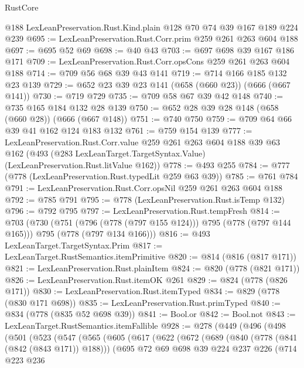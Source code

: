 \begin{lexlean}{RustCore}
\begin{coremodule}
    @188
    LexLeanPreservation.Rust.Kind.plain
    @128
    @70
    @74
    @39
    @167
    @189
    @224
    @239
@695 := LexLeanPreservation.Rust.Corr.prim @259 @261 @263 @604 @188
@697 := @695 @52 @69
@698 := @40 @43
@703 := @697 @698 @39 @167 @186 @171
@709 := LexLeanPreservation.Rust.Corr.opsCons @259 @261 @263 @604 @188
@714 := @709 @56 @68 @39 @43 @141
@719 := @714 @166 @185 @132 @23 @139
@729 := @652 @23 @39 @23 @141 (@658 (@660 @23)) (@666 (@667 @141))
@730 := @719 @729
@735 := @709 @58 @67 @39 @42 @148
@740 := @735 @165 @184 @132 @28 @139
@750 := @652 @28 @39 @28 @148 (@658 (@660 @28)) (@666 (@667 @148))
@751 := @740 @750
@759 := @709 @64 @66 @39 @41 @162 @124 @183 @132
@761 := @759 @154 @139
@777 := LexLeanPreservation.Rust.Corr.value
    @259
    @261
    @263
    @604
    @188
    @39
    @63
    @162
    (@493 (@283 LexLeanTarget.TargetSyntax.Value) (LexLeanPreservation.Rust.litValue @162))
@778 := @493 @255
@784 := @777 (@778 (LexLeanPreservation.Rust.typedLit @259 @63 @39))
@785 := @761 @784
@791 := LexLeanPreservation.Rust.Corr.opsNil @259 @261 @263 @604 @188
@792 := @785 @791
@795 := @778 (LexLeanPreservation.Rust.isTemp @132)
@796 := @792 @795
@797 := LexLeanPreservation.Rust.tempFresh
@814 := @703
    (@730
      (@751 (@796 (@778 (@797 @155 @124))) @795 (@778 (@797 @144 @165)))
      @795
      (@778 (@797 @134 @166)))
@816 := @493 LexLeanTarget.TargetSyntax.Prim
@817 := LexLeanTarget.RustSemantics.itemPrimitive
@820 := @814 (@816 (@817 @171))
@821 := LexLeanPreservation.Rust.plainItem
@824 := @820 (@778 (@821 @171))
@826 := LexLeanPreservation.Rust.itemOK @261
@829 := @824 (@778 (@826 @171))
@830 := LexLeanPreservation.Rust.itemTyped
@834 := @829 (@778 (@830 @171 @698))
@835 := LexLeanPreservation.Rust.primTyped
@840 := @834 (@778 (@835 @52 @698 @39))
@841 := Bool.or
@842 := Bool.not
@843 := LexLeanTarget.RustSemantics.itemFallible
@928 := @278
    (@449
      (@496
        (@498
          (@501
            (@523
              (@547
                (@565
                  (@605
                    (@617
                      (@622
                        (@672
                          (@689
                            (@840 (@778 (@841 (@842 (@843 @171)) @188)))
                            (@695
                              @72
                              @69
                              @698
                              @39
                              @224
                              @237
                              @226
                              (@714
                                @223
                                @236

\end{coremodule}
\end{lexlean}
